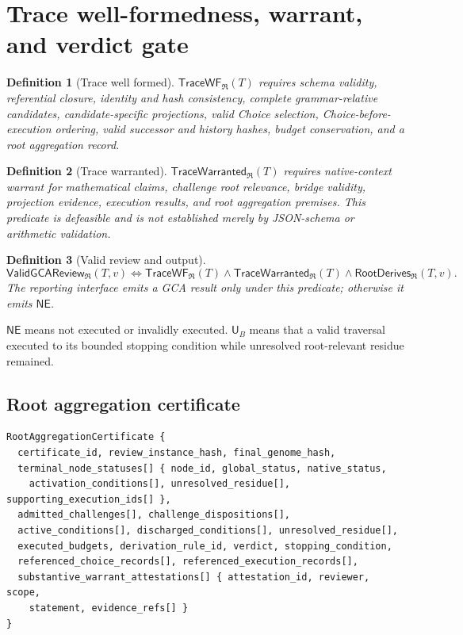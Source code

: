 \documentclass[10pt]{article}
\newtheorem{definition}{Definition}[section]
\newcommand{\UB}{\mathsf{U}_B}
\newcommand{\NE}{\mathsf{NE}}
\newcommand{\TraceWF}{\mathsf{TraceWF}}
\newcommand{\TraceW}{\mathsf{TraceWarranted}}
\newcommand{\ValidReview}{\mathsf{ValidGCAReview}}
\begin{document}
\section{Trace well-formedness, warrant, and verdict gate}

\begin{definition}[Trace well formed]
$\TraceWF_{\mathfrak R}(T)$ requires schema validity, referential closure, identity and hash consistency, complete grammar-relative candidates, candidate-specific projections, valid Choice selection, Choice-before-execution ordering, valid successor and history hashes, budget conservation, and a root aggregation record.
\end{definition}

\begin{definition}[Trace warranted]
$\TraceW_{\mathfrak R}(T)$ requires native-context warrant for mathematical claims, challenge root relevance, bridge validity, projection evidence, execution results, and root aggregation premises.  This predicate is defeasible and is not established merely by JSON-schema or arithmetic validation.
\end{definition}

\begin{definition}[Valid review and output]
\[
\ValidReview_{\mathfrak R}(T,v)
\iff \TraceWF_{\mathfrak R}(T)\land\TraceW_{\mathfrak R}(T)
\land\mathsf{RootDerives}_{\mathfrak R}(T,v).
\]
The reporting interface emits a GCA result only under this predicate; otherwise it emits $\NE$.
\end{definition}

$\NE$ means not executed or invalidly executed.  $\UB$ means that a valid traversal executed to its bounded stopping condition while unresolved root-relevant residue remained.

\subsection{Root aggregation certificate}
\begin{Verbatim}[fontsize=\small,frame=single]
RootAggregationCertificate {
  certificate_id, review_instance_hash, final_genome_hash,
  terminal_node_statuses[] { node_id, global_status, native_status,
    activation_conditions[], unresolved_residue[], supporting_execution_ids[] },
  admitted_challenges[], challenge_dispositions[],
  active_conditions[], discharged_conditions[], unresolved_residue[],
  executed_budgets, derivation_rule_id, verdict, stopping_condition,
  referenced_choice_records[], referenced_execution_records[],
  substantive_warrant_attestations[] { attestation_id, reviewer, scope,
    statement, evidence_refs[] }
}
\end{Verbatim}
\end{document}
